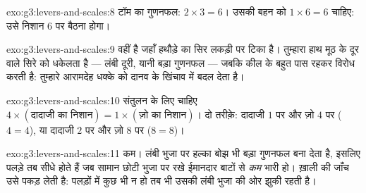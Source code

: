 \begin{solution}{exo:g3:levers-and-scales:8}
टॉम का गुणनफल: $2 \times 3 = 6$। उसकी बहन को $1 \times 6 = 6$
चाहिए: उसे निशान $6$ पर बैठना होगा।
\end{solution}

\begin{solution}{exo:g3:levers-and-scales:9}
 वहीं है जहाँ हथौड़े का सिर लकड़ी पर टिका है। तुम्हारा हाथ मूठ के
दूर वाले सिरे को धकेलता है --- लंबी दूरी, यानी बड़ा गुणनफल --- जबकि
कील  के बहुत पास रहकर विरोध करती है:  तुम्हारे आरामदेह
धक्के को दानव के खिंचाव में बदल देता है।
\end{solution}

\begin{solution}{exo:g3:levers-and-scales:10}
संतुलन के लिए चाहिए $4 \times (\text{दादाजी का निशान}) = 1 \times
(\text{ज़ो का निशान})$। दो तरीक़े: दादाजी $1$ पर और ज़ो $4$ पर
($4 = 4$), या दादाजी $2$ पर और ज़ो $8$ पर ($8 = 8$)।
\end{solution}

\begin{solution}{exo:g3:levers-and-scales:11}
कम। लंबी भुजा पर हल्का बोझ भी बड़ा गुणनफल बना देता है, इसलिए पलड़े
तब सीधे होते हैं जब सामान छोटी भुजा पर रखे ईमानदार बाटों से
\emph{कम} भारी हो। ख़ाली  की जाँच उसे पकड़ लेती है: पलड़ों में
कुछ भी न हो तब भी उसकी  लंबी भुजा की ओर झुकी रहती है।
\end{solution}
